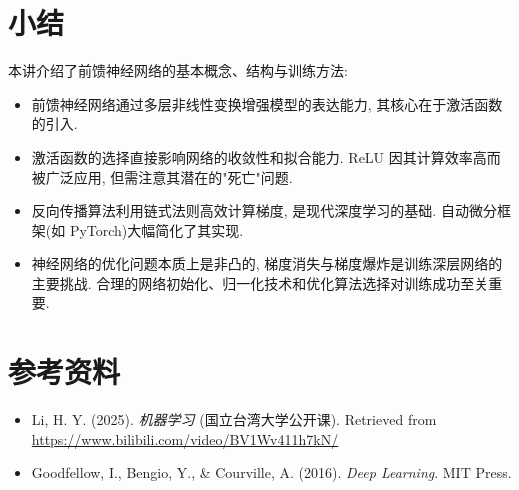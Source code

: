 \documentclass{../nndlcourse}
\begin{document}
\section{小结}

本讲介绍了前馈神经网络的基本概念、结构与训练方法: 

\begin{itemize}
    \item 前馈神经网络通过多层非线性变换增强模型的表达能力, 其核心在于激活函数的引入. 
    \item 激活函数的选择直接影响网络的收敛性和拟合能力. ReLU 因其计算效率高而被广泛应用, 但需注意其潜在的"死亡"问题. 
    \item 反向传播算法利用链式法则高效计算梯度, 是现代深度学习的基础. 自动微分框架(如 PyTorch)大幅简化了其实现. 
    \item 神经网络的优化问题本质上是非凸的, 梯度消失与梯度爆炸是训练深层网络的主要挑战. 合理的网络初始化、归一化技术和优化算法选择对训练成功至关重要. 
\end{itemize}

\section{参考资料}

\begin{itemize}
    \item Li, H. Y. (2025). \textit{机器学习} (国立台湾大学公开课). Retrieved from \url{https://www.bilibili.com/video/BV1Wv411h7kN/}
    \item Goodfellow, I., Bengio, Y., \& Courville, A. (2016). \textit{Deep Learning}. MIT Press.
\end{itemize}
\end{document}

